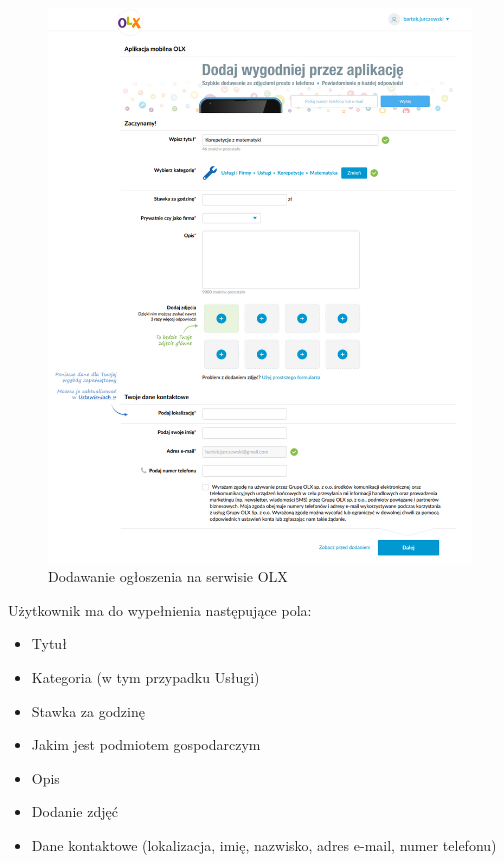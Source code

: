 \documentclass[12pt]{article}
\numberwithin{figure}{section}
\begin{document}
    \begin{figure}[H]
    	\centering
    	\includegraphics[width=1\textwidth]{images/chapter_2/olx-add-announcement.png}
    	\caption{Dodawanie ogłoszenia na serwisie OLX}
    	\label{fig:olx-add-announcement}
    \end{figure}

Użytkownik ma do wypełnienia następujące pola:
\begin{itemize}
    \item Tytuł
    \item Kategoria (w tym przypadku Usługi)
    \item Stawka za godzinę
    \item Jakim jest podmiotem gospodarczym
    \item Opis
    \item Dodanie zdjęć
    \item Dane kontaktowe (lokalizacja, imię, nazwisko, adres e-mail, numer telefonu)
\end{itemize}
\end{document}
